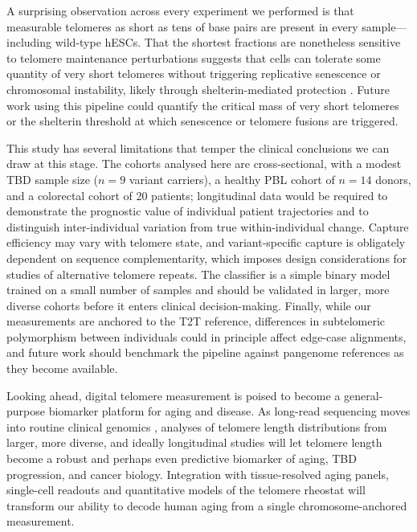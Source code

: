 \documentclass[11pt]{article}
\begin{document}
A surprising observation across every experiment we performed is that
measurable telomeres as short as tens of base pairs are present in
every sample---including wild-type hESCs. That the shortest fractions
are nonetheless sensitive to telomere maintenance perturbations
suggests that cells can tolerate some quantity of very short telomeres
without triggering replicative senescence or chromosomal instability,
likely through shelterin-mediated protection
\citep{palm2008howshelterin}. Future work using this pipeline could
quantify the critical mass of very short telomeres or the shelterin
threshold at which senescence or telomere fusions are triggered.

This study has several limitations that temper the clinical conclusions
we can draw at this stage. The cohorts analysed here are
cross-sectional, with a modest TBD sample size ($n{=}9$ variant
carriers), a healthy PBL cohort of $n{=}14$ donors, and a colorectal
cohort of 20 patients; longitudinal data would be required to
demonstrate the prognostic value of individual patient trajectories and
to distinguish inter-individual variation from true within-individual
change. Capture efficiency may vary with telomere state, and
variant-specific capture is obligately dependent on sequence
complementarity, which imposes design considerations for studies of
alternative telomere repeats. The classifier is a simple binary model
trained on a small number of samples and should be validated in larger,
more diverse cohorts before it enters clinical decision-making. Finally,
while our measurements are anchored to the T2T reference, differences in
subtelomeric polymorphism between individuals could in principle affect
edge-case alignments, and future work should benchmark the pipeline
against pangenome references as they become available.

Looking ahead, digital telomere measurement is poised to become a
general-purpose biomarker platform for aging and disease. As long-read
sequencing moves into routine clinical genomics
\citep{nurk2022complete}, analyses of telomere length distributions
from larger, more diverse, and ideally longitudinal studies will let
telomere length become a robust and perhaps even predictive biomarker
of aging, TBD progression, and cancer biology. Integration with
tissue-resolved aging panels, single-cell readouts and quantitative
models of the telomere rheostat will transform our ability to decode
human aging from a single chromosome-anchored measurement.



\end{document}
